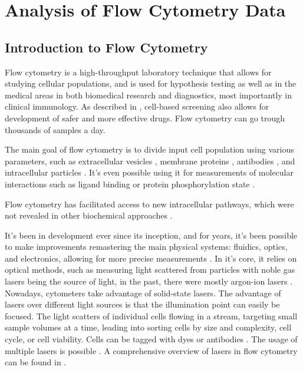 \chapter{Analysis of Flow Cytometry Data}
\label{chap:two}

\section{Introduction to Flow Cytometry}
\label{sec:introtoflow}
Flow cytometry is a high-throughput laboratory technique that allows for studying cellular populations, and is used for hypothesis testing as well as in the medical areas in both biomedical research and diagnostics, most importantly in clinical immunology. As described in \cite{black2011cell} , cell-based screening also allows for development of safer and more effective drugs. Flow cytometry can go trough thousands of samples a day.

The main goal of flow cytometry is to divide input cell population using various parameters, such as extracellular vesicles \citep{nolan2015flow}, membrane proteins \citep{schmitz2021bimolecular}, antibodies \citep{kalina2020relevance, hall1996use}, and intracellular particles \citep{pirone2021three, wronska2022intracellular}. It's even possible using it for measurements of molecular interactions such as ligand binding \citep{nolan1998emergence} or protein phosphorylation state \citep{perez2002simultaneous}.

Flow cytometry has facilitated access to new intracellular pathways, which were not revealed in other biochemical approaches \citep{sachs2005causal}.

It's been in development ever since its inception, and for years, it's been possible to make improvements remastering the main physical systems: fluidics, optics, and electronics, allowing for more precise measurements \citep{picot2012flow}. In it's core, it relies on optical methods, such as measuring light scattered from particles with noble gas lasers being the source of light, in the past, there were mostly argon-ion lasers \citep{kamentsky1991microscope}. Nowadays, cytometers take advantage of solid-state lasers. The advantage of lasers over different light sources is that the illumination point can easily be focused. The light scatters of individual cells flowing in a stream, targeting small sample volumes at a time, leading into sorting cells by size and complexity, cell cycle, or cell viability. Cells can be tagged with dyes or antibodies \citep{wilkerson2012principles}. The usage of multiple lasers is possible \citep{bigos1999nine, de2016quantification, ashcroft2000commercial}. A comprehensive overview of lasers in flow cytometry can be found in \cite{shapiro2018lasers}.

